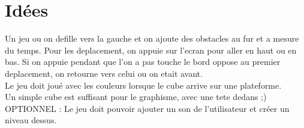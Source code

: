 \documentclass{article}
\begin{document}
\section{Idées}
Un jeu ou on defille vers la gauche et on ajoute des obstacles au fur et a mesure du temps. Pour les deplacement, on appuie sur l'ecran pour aller en haut ou en bas. Si on appuie pendant que l'on a pas touche le bord oppose au premier deplacement, on retourne vers celui ou on etait avant.\\


Le jeu doit joué avec les couleurs lorsque le cube arrive sur une plateforme.\\

Un simple cube est suffisant pour le graphisme, avec une tete dedans ;)\\

OPTIONNEL : Le jeu doit pouvoir ajouter un son de l'utilisateur et créer un niveau dessus.\\
\end{document}
